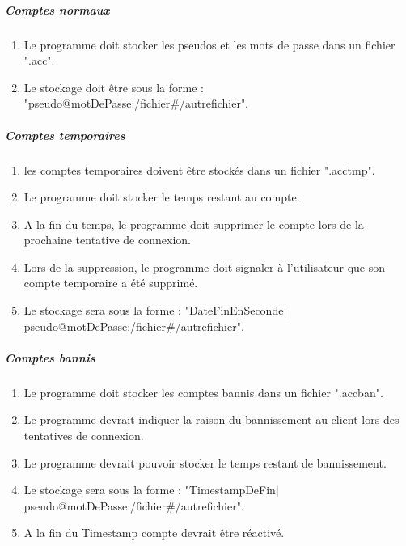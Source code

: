 \documentclass[10pt,a4paper]{report}
\begin{document}
	\subparagraph{Comptes normaux}
		\begin{enumerate}
			\item Le programme doit stocker les pseudos et les mots de passe dans un fichier ".acc".
			\item Le stockage doit être sous la forme : "pseudo@motDePasse:/fichier\#/autrefichier".
		\end{enumerate}
	\subparagraph{Comptes temporaires}
		\begin{enumerate}
			\item les comptes temporaires doivent être stockés dans un fichier ".acctmp".
			\item Le programme doit stocker le temps restant au compte.
			\item A la fin du temps, le programme doit supprimer le compte lors de la prochaine tentative de connexion.
			\item Lors de la suppression, le programme doit signaler à l'utilisateur que son compte temporaire a été supprimé.
			\item Le stockage sera sous la forme : "DateFinEnSeconde$ \vert $pseudo@motDePasse:/fichier\#/autrefichier".

		\end{enumerate}
	\subparagraph{Comptes bannis}
		\begin{enumerate}
			\item Le programme doit stocker les comptes bannis dans un fichier ".accban".
			\item Le programme devrait indiquer la raison du bannissement au client lors des tentatives de connexion.
			\item Le programme devrait pouvoir stocker le temps restant de bannissement.
			\item Le stockage sera sous la forme : "TimestampDeFin$ \vert $pseudo@motDePasse:/fichier\#/autrefichier".
			\item A la fin du Timestamp compte devrait être réactivé.
		\end{enumerate}
		
\end{document}
